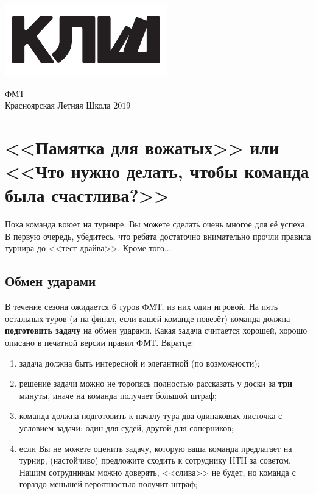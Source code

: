 \documentclass[12pt]{article}
\begin{document}
\begin{flushleft}
\parbox[t][0pt]{0.2\textwidth}
{
{%
\vspace{0\baselineskip}
\includegraphics[scale=1.5]{klsh_logo_mod.pdf}\par
}
}
\end{flushleft}
\hfill
\parbox[t][0pt]{0.80\textwidth}
{
{\centering
\vspace{-1.5\baselineskip}
\begin{flushright}
{\Huge ФМТ}\\
{Красноярская Летняя Школа $2019$}
\end{flushright}
}
}
\vspace{4\baselineskip}

\section*{<<Памятка для вожатых>> или <<Что нужно делать, чтобы команда была счастлива?>>}
Пока команда воюет на турнире, Вы можете сделать очень многое для её успеха. В первую очередь, убедитесь, что ребята достаточно внимательно прочли правила турнира до <<тест-драйва>>. Кроме того...
\subsection*{Обмен ударами}
В течение сезона ожидается 6 туров ФМТ, из них один игровой. На пять остальных туров (и на финал, если вашей команде повезёт) команда должна {\bf подготовить задачу} на обмен ударами. Какая задача считается хорошей, хорошо описано в печатной версии правил ФМТ. Вкратце:

\begin{enumerate}
	\item задача должна быть интересной и элегантной (по возможности);
	\item решение задачи можно не торопясь полностью рассказать у доски за {\bf три} минуты, иначе на команда получает большой штраф;
	\item команда должна подготовить к началу тура два одинаковых листочка с условием задачи: один для судей, другой для соперников;
	\item если Вы не можете оценить задачу, которую ваша команда предлагает на турнир, (настойчиво) предложите сходить к сотруднику НТН за советом. Нашим сотрудникам можно доверять, <<слива>> не будет, но команда с гораздо меньшей вероятностью получит штраф;
\end{enumerate}
\end{document}
